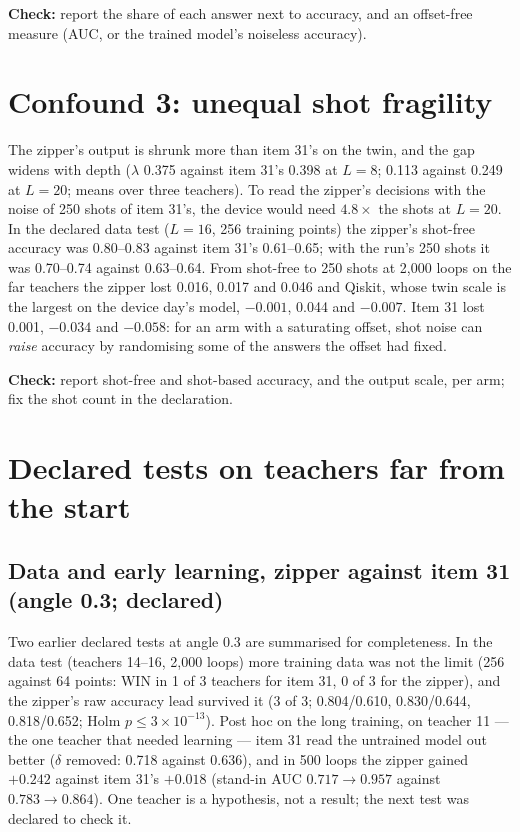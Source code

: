\documentclass[11pt]{article}
\begin{document}
\textbf{Check:} report the share of each answer next to accuracy, and an offset-free measure (AUC, or the trained
model's noiseless accuracy).

\section{Confound 3: unequal shot fragility}
\label{sec:shots}

The zipper's output is shrunk more than item 31's on the twin, and the gap widens with depth ($\lambda$ 0.375 against
item 31's 0.398 at $L = 8$; 0.113 against 0.249 at $L = 20$; means over three teachers). To read the zipper's decisions with the
noise of 250 shots of item 31's, the device would need $4.8\times$ the shots at $L = 20$. In the declared data test
($L = 16$, 256 training points) the zipper's shot-free accuracy was 0.80--0.83 against item 31's 0.61--0.65; with the
run's 250 shots it was 0.70--0.74 against 0.63--0.64. From shot-free to 250 shots at 2{,}000 loops on the far
teachers the zipper lost 0.016, 0.017 and 0.046 and Qiskit, whose twin scale is the largest on the device day's
model, $-0.001$, 0.044 and $-0.007$. Item 31 lost 0.001, $-0.034$ and $-0.058$: for an arm with a saturating offset,
shot noise can \emph{raise} accuracy by randomising some of the answers the offset had fixed.

\textbf{Check:} report shot-free and shot-based accuracy, and the output scale, per arm; fix the shot count in the
declaration.

\section{Declared tests on teachers far from the start}

\subsection{Data and early learning, zipper against item 31 (angle 0.3; declared)}

Two earlier declared tests at angle 0.3 are summarised for completeness. In the data test (teachers 14--16, 2{,}000
loops) more training data was not the limit (256 against 64 points: WIN in 1 of 3 teachers for item 31, 0 of 3 for
the zipper), and the zipper's raw accuracy lead survived it (3 of 3; 0.804/0.610, 0.830/0.644, 0.818/0.652; Holm $p
\le 3\times10^{-13}$). Post hoc on the long training, on teacher 11 --- the one teacher that needed learning ---
item 31 read the untrained model out better ($\delta$ removed: 0.718 against 0.636), and in 500 loops the zipper
gained $+0.242$ against item 31's $+0.018$ (stand-in AUC $0.717 \to 0.957$ against $0.783 \to 0.864$). One teacher is
a hypothesis, not a result; the next test was declared to check it.
\end{document}
